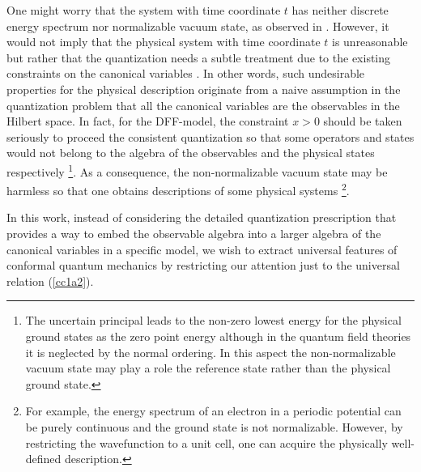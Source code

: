 \documentclass[12pt]{article}
\numberwithin{equation}{section}
\begin{document}
One might worry that 
the system with time coordinate $t$ has neither discrete energy spectrum nor normalizable vacuum state, 
as observed in \cite{deAlfaro:1976je}. 
However, it would not imply that 
the physical system with time coordinate $t$ is unreasonable but rather that 
the quantization needs a subtle treatment due to the existing constraints on the canonical variables \cite{Strocchi:2016kce}. 
In other words, such undesirable properties for the physical description 
originate from a naive assumption in the quantization problem that 
all the canonical variables are the observables in the Hilbert space. 
In fact, for the DFF-model, the constraint $x>0$ should be taken seriously 
to proceed the consistent quantization so that 
some operators and states would not belong to the algebra of the observables 
and the physical states respectively 
\footnote{
The uncertain principal leads to the non-zero lowest energy for the physical ground states as the zero point energy 
although in the quantum field theories it is neglected by the normal ordering. 
In this aspect the non-normalizable vacuum state may play a role the reference state 
rather than the physical ground state. 
}. 
As a consequence, the non-normalizable vacuum state 
may be harmless so that one obtains descriptions of some physical systems 
\footnote{
For example, 
the energy spectrum of an electron in a periodic potential can be purely continuous 
and the ground state is not normalizable. 
However, by restricting the wavefunction to a unit cell, 
one can acquire the physically well-defined description. }. 



In this work, 
instead of considering the detailed quantization prescription that 
provides a way to embed the observable algebra into a larger algebra of the canonical variables in a specific model, 
we wish to extract universal features of conformal quantum mechanics 
by restricting our attention just to the universal relation (\ref{cc1a2}). 
\end{document}

